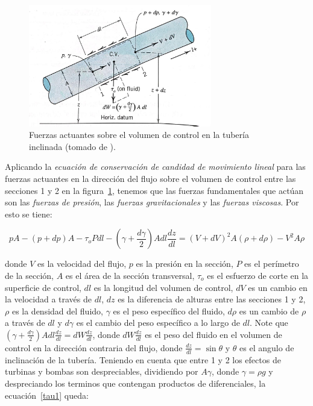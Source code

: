 \documentclass[11pt, oneside]{article}
\begin{document}
\begin{figure}[h]
\centering
\includegraphics[width=8cm]{tau.jpeg}
\caption{Fuerzas actuantes sobre el volumen de control en la tuber\'ia inclinada (tomado de \cite{street471elementary}).}
\label{tau}
\end{figure}

Aplicando la \emph{ecuaci\'on de conservaci\'on de candidad de movimiento lineal} para las fuerzas actuantes en la direcci\'on del flujo sobre el volumen de control entre las secciones 1 y 2 en la  figura~\ref{tau}, tenemos que las fuerzas fundamentales que act\'uan son las \emph{fuerzas de presi\'on}, las \emph{fuerzas gravitacionales} y las \emph{fuerzas viscosas}. Por esto se tiene:

\begin{equation}
pA - (p+dp)A - \tau_{o} P dl - \left( \gamma + \frac{d \gamma}{2} \right)A dl \frac{dz}{dl} = (V+dV)^2 A (\rho +d \rho)- V^2 A \rho
\label{tau1}
\end{equation}

donde $V$ es la velocidad del flujo, $p$ es la presi\'on en la secci\'on, $P$ es el per\'imetro de la secci\'on, $A$ es el \'area de la secci\'on transversal, $\tau_{o}$ es el esfuerzo de corte en la superficie de control, $dl$ es la longitud del volumen de control, $dV$ es un cambio en la velocidad a trav\'es de $dl$, $dz$ es la diferencia de alturas entre las secciones 1 y 2, $\rho$ es la densidad del fluido, $\gamma$ es el peso espec\'ifico del fluido, $d \rho$ es un cambio de $\rho$ a trav\'es de $dl$ y $d \gamma$ es el cambio del peso espec\'ifico a lo largo de $dl$. Note que $\left( \gamma + \frac{d \gamma}{2} \right) A dl \frac{dz}{dl} = dW \frac{dz}{dl}$, donde $dW \frac{dz}{dl}$ es el peso del fluido en el volumen de control en la direcci\'on contraria del flujo, donde $\frac{dz}{dl}=\sin \theta$ y $\theta$ es el angulo de inclinaci\'on de la tuber\'ia. Teniendo en cuenta que entre 1 y 2 los efectos de turbinas y bombas son despreciables, dividiendo por $A\gamma$, donde $\gamma = \rho g$ y despreciando los terminos que contengan productos de diferenciales,  la ecuaci\'on~\ref{tau1} queda: 
 
\end{document}
